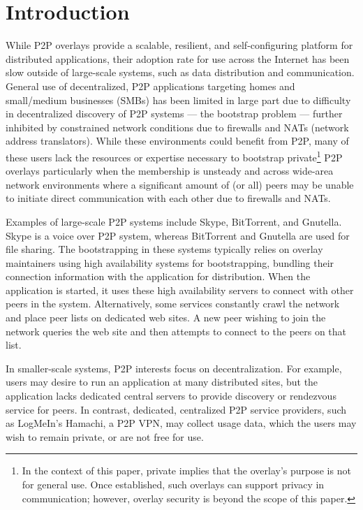\documentclass[conference]{IEEEtran}
\begin{document}
\section{Introduction}

While P2P overlays provide a scalable, resilient, and self-configuring platform
for distributed applications, their adoption rate for use across the Internet
has been slow outside of large-scale systems, such as data distribution and
communication.  General use of decentralized, P2P applications targeting homes
and small/medium businesses (SMBs) has been limited in large part due to
difficulty in decentralized discovery of P2P systems --- the bootstrap problem
--- further inhibited by constrained network conditions due to firewalls and
NATs (network address translators).  While these environments could benefit
from P2P, many of these users lack the resources or expertise necessary to
bootstrap private\footnote{In the context of this paper, private implies that
the overlay's purpose is not for general use. Once established, such overlays
can support privacy in communication; however, overlay security is beyond the
scope of this paper.} P2P overlays particularly when the membership is unsteady
and across wide-area network environments where a significant amount of (or
all) peers may be unable to initiate direct communication with each other due
to firewalls and NATs.

Examples of large-scale P2P systems include Skype, BitTorrent, and Gnutella.
Skype is a voice over P2P system, whereas BitTorrent and Gnutella are used for
file sharing.  The bootstrapping in these systems typically relies on overlay
maintainers using high availability systems for bootstrapping, bundling their
connection information with the application for distribution.  When the
application is started, it uses these high availability servers to connect with
other peers in the system.  Alternatively, some services constantly crawl the
network and place peer lists on dedicated web sites. A new peer wishing to join
the network queries the web site and then attempts to connect to the peers on
that list.

In smaller-scale systems, P2P interests focus on decentralization.  For
example, users may desire to run an application at many distributed sites, but
the application lacks dedicated central servers to provide discovery or
rendezvous service for peers.  In contrast, dedicated, centralized P2P service
providers, such as LogMeIn's Hamachi, a P2P VPN, may collect usage data, which
the users may wish to remain private, or are not free for use.
\end{document}
